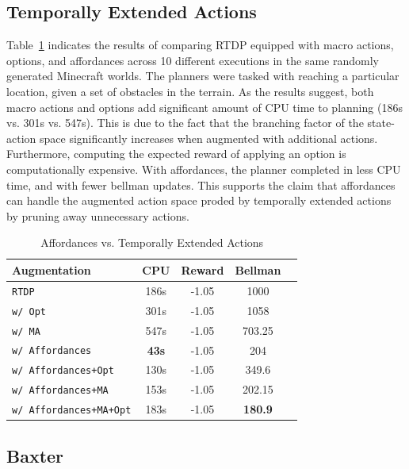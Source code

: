 \documentclass[conference]{IEEEtran}
\begin{document}
\subsection{Temporally Extended Actions}

Table~\ref{table:temp_ext_act_results} indicates the results of comparing RTDP equipped with macro actions, options, and affordances across 10 different executions in the same randomly generated Minecraft worlds. The planners were tasked with reaching a particular location, given a set of obstacles in the terrain. As the results suggest, both macro actions and options add significant amount of CPU time to planning (186s vs. 301s vs. 547s). This is due to the fact that the branching factor of the state-action space significantly increases when augmented with additional actions. Furthermore, computing the expected reward of applying an option is computationally expensive. With affordances, the planner completed in less CPU time, and with fewer bellman updates. This supports the claim that affordances can handle the augmented action space proded by temporally extended actions by pruning away unnecessary actions.

\begin{table}[H]
\centering
\begin{tabular}{ l  || c c c c}
  Augmentation 						&	CPU	&	Reward 	& Bellman \\ \hline
  \texttt{RTDP}  						&	186s	&	-1.05		&	1000		\\
  \texttt{w/ Opt}  					&	301s	&	-1.05		&	1058		\\
  \texttt{w/ MA}  						&	547s	&	-1.05		&	703.25		\\
  \texttt{w/ Affordances}  				& 	{\bf 43s}	&	-1.05		&	204		\\
  \texttt{w/ Affordances+Opt}  			& 	130s	&	-1.05		&	349.6		\\
   \texttt{w/ Affordances+MA}  			& 	153s	&	-1.05		&	202.15		\\
   \texttt{w/ Affordances+MA+Opt}  		& 	183s	&	-1.05		&	{\bf 180.9}		\\
\end{tabular}
\caption{Affordances vs. Temporally Extended Actions}
\label{table:temp_ext_act_results}
\end{table}

\subsection{Baxter}
\end{document}
